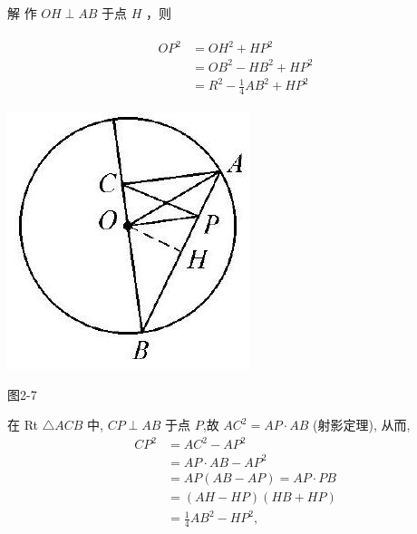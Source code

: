 \documentclass[10pt]{article}
\begin{document}
解 作 $O H \perp A B$ 于点 $H$ ，则

\begin{align*}
\begin{aligned}
O P^{2} & =O H^{2}+H P^{2} \\
& =O B^{2}-H B^{2}+H P^{2} \\
& =R^{2}-\frac{1}{4} A B^{2}+H P^{2}
\end{aligned}
\end{align*}

\begin{center}
\includegraphics[max width=\textwidth]{2024_10_30_66b8e5e701da2093c133g-020(1)}
\end{center}

图2-7

在 Rt $\triangle A C B$ 中, $C P \perp A B$ 于点 $P$,故 $A C^{2}=A P \cdot A B$ (射影定理), 从而,
\begin{align*}
C P^{2} & =A C^{2}-A P^{2} \\
& =A P \cdot A B-A P^{2} \\
& =A P(A B-A P)=A P \cdot P B \\
& =(A H-H P)(H B+H P) \\
& =\frac{1}{4} A B^{2}-H P^{2},
\end{align*} 
\end{document}

